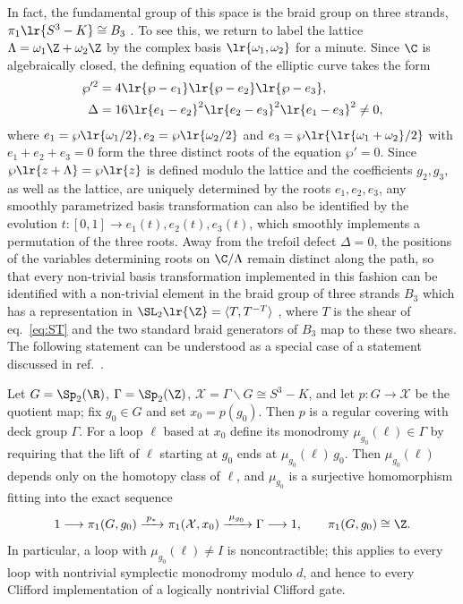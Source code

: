 \documentclass[a4paper, aps, pra, 11pt, onecolumn, tightenlines, superscriptaddress]{revtex4-2}
\begin{document}
In fact, the fundamental group of this space is the braid group on three strands, $\pi_1\lr{S^3-K}\cong B_3$ \cite{Gannon2023}. 
To see this, we return to label the lattice $\Lambda=\omega_1\Z +\omega_2\Z$ by the complex basis $\lr{\omega_1, \omega_2}$ for a minute. Since $\C$ is algebraically closed, the defining equation of the elliptic curve takes the form \cite[Sec.~III.1]{Silverman2009}
\begin{align}
    \wp'^2 &= 4\lr{\wp-e_1}\lr{\wp-e_2}\lr{\wp-e_3},\\
    \Delta&=16\lr{e_1-e_2}^2\lr{e_2-e_3}^2\lr{e_1-e_3}^2 \neq 0,
\end{align}
where $e_1=\wp\lr{\omega_1/2}, e_2=\wp\lr{\omega_2/2}$ and $e_3=\wp\lr{\lr{\omega_1+\omega_2}/2}$ with $e_1+e_2+e_3=0$ form the three distinct roots of the equation $\wp'=0$. Since $\wp\lr{z+\Lambda}=\wp\lr{z}$ is defined modulo the lattice and the coefficients $g_2, g_3$, as well as the lattice, are uniquely determined by the roots $e_1, e_2, e_3$, any smoothly parametrized basis transformation can also be identified by the evolution $t: [0,1]\rightarrow e_1(t), e_2(t), e_3(t)$, which smoothly implements a permutation of the three roots. Away from the trefoil defect $\Delta=0$, the positions of the variables determining roots on $\C/\Lambda$ remain distinct along the path, so that every non-trivial basis transformation implemented in this fashion can be identified with a non-trivial element in the braid group of three strands $B_3$ which has a representation in $\SL_2\lr{\Z}=\langle T, T^{-T} \rangle$ \cite{Gannon2023}, where $T$ is the shear of eq.~\eqref{eq:ST} and the two standard braid generators of $B_3$ map to these two shears. The following statement can be understood as a special case of a statement discussed in ref.~\cite{Burchards_GeometricGKP}.
%
\begin{prop}\label{prop:noncontractible}
Let $G=\Sp_2(\R)$, $\Gamma=\Sp_2(\Z)$, $\mathcal X=\Gamma\backslash G\cong S^3-K$, and let
$p:G\to\mathcal X$ be the quotient map; fix $g_0\in G$ and set $x_0=p(g_0)$.
Then $p$ is a regular covering with deck group $\Gamma$. For a loop $\ell$ based at
$x_0$ define its monodromy $\mu_{g_0}(\ell)\in\Gamma$ by requiring that the lift of
$\ell$ starting at $g_0$ ends at $\mu_{g_0}(\ell)\,g_0$. Then $\mu_{g_0}(\ell)$ depends
only on the homotopy class of $\ell$, and $\mu_{g_0}$ is a surjective homomorphism
fitting into the exact sequence
\begin{equation}
1\longrightarrow\pi_1(G,g_0)\xrightarrow{\;p_*\;}\pi_1(\mathcal X,x_0)
\xrightarrow{\;\mu_{g_0}\;}\Gamma\longrightarrow1,\qquad \pi_1(G,g_0)\cong\Z.
\end{equation}
In particular, a loop with $\mu_{g_0}(\ell)\neq I$ is noncontractible; this applies to every loop with nontrivial symplectic monodromy modulo $d$, and hence to every Clifford implementation of a logically nontrivial Clifford gate.
\end{prop}
\end{document}
